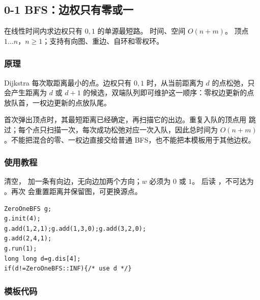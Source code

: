\subsection{0-1 BFS：边权只有零或一}
\label{algo:zero-one-bfs}
\AlgorithmInfo
    {在线性时间内求边权只有 $0,1$ 的单源最短路。}
    {时间、空间 $O(n+m)$。}
    {顶点 $1\ldots n$，$n\geq1$；支持有向图、重边、自环和零权环。}

\subsubsection*{原理}
Dijkstra 每次取距离最小的点。边权只有 $0,1$ 时，从当前距离为 $d$ 的点松弛，只会产生距离为 $d$ 或 $d+1$ 的候选，双端队列即可维护这一顺序：零权边更新的点放队首，一权边更新的点放队尾。

首次弹出顶点时，其最短距离已经确定，再扫描它的出边。重复入队的顶点用  跳过；每个点只扫描一次，每次成功松弛对应一次入队，因此总时间为 $O(n+m)$。不能把混合的零、一权边直接交给普通 BFS，也不能把本模板用于其他边权。

\subsubsection*{使用教程}
 清空， 加一条有向边，无向边加两个方向；$w$ 必须为 $0$ 或 $1$。 后读 ，不可达为 。再次  会重置距离并保留图，可更换源点。
\begin{lstlisting}[style=mtycpp,numbers=none]
ZeroOneBFS g;
g.init(4);
g.add(1,2,1);g.add(1,3,0);g.add(3,2,0);
g.add(2,4,1);
g.run(1);
long long d=g.dis[4];
if(d!=ZeroOneBFS::INF){/* use d */}
\end{lstlisting}

\subsubsection*{模板代码}
